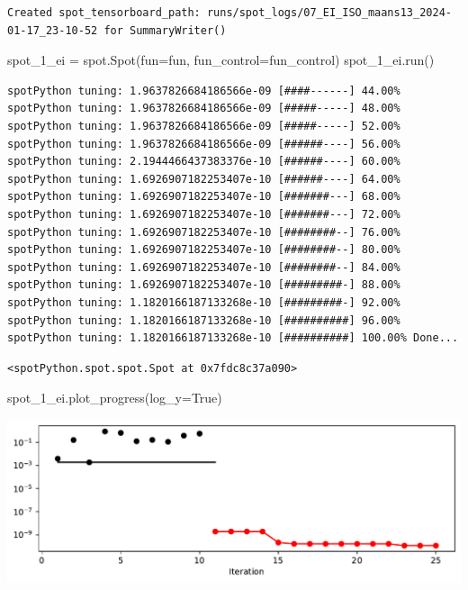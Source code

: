 \documentclass[
  letterpaper,
  DIV=11,
  numbers=noendperiod]{scrreprt}
\newenvironment{Shaded}{\begin{snugshade}}{\end{snugshade}}
\newcommand{\NormalTok}[1]{\textcolor[rgb]{0.00,0.23,0.31}{#1}}
\newcommand{\OperatorTok}[1]{\textcolor[rgb]{0.37,0.37,0.37}{#1}}
\newcommand{\VariableTok}[1]{\textcolor[rgb]{0.07,0.07,0.07}{#1}}
\begin{document}
\begin{verbatim}
Created spot_tensorboard_path: runs/spot_logs/07_EI_ISO_maans13_2024-01-17_23-10-52 for SummaryWriter()
\end{verbatim}

\begin{Shaded}
\begin{Highlighting}[]
\NormalTok{spot\_1\_ei }\OperatorTok{=}\NormalTok{ spot.Spot(fun}\OperatorTok{=}\NormalTok{fun,}
\NormalTok{                     fun\_control}\OperatorTok{=}\NormalTok{fun\_control)}
\NormalTok{spot\_1\_ei.run()}
\end{Highlighting}
\end{Shaded}

\begin{verbatim}
spotPython tuning: 1.9637826684186566e-09 [####------] 44.00% 
spotPython tuning: 1.9637826684186566e-09 [#####-----] 48.00% 
spotPython tuning: 1.9637826684186566e-09 [#####-----] 52.00% 
spotPython tuning: 1.9637826684186566e-09 [######----] 56.00% 
spotPython tuning: 2.1944466437383376e-10 [######----] 60.00% 
spotPython tuning: 1.6926907182253407e-10 [######----] 64.00% 
spotPython tuning: 1.6926907182253407e-10 [#######---] 68.00% 
spotPython tuning: 1.6926907182253407e-10 [#######---] 72.00% 
spotPython tuning: 1.6926907182253407e-10 [########--] 76.00% 
spotPython tuning: 1.6926907182253407e-10 [########--] 80.00% 
spotPython tuning: 1.6926907182253407e-10 [########--] 84.00% 
spotPython tuning: 1.6926907182253407e-10 [#########-] 88.00% 
spotPython tuning: 1.1820166187133268e-10 [#########-] 92.00% 
spotPython tuning: 1.1820166187133268e-10 [##########] 96.00% 
spotPython tuning: 1.1820166187133268e-10 [##########] 100.00% Done...
\end{verbatim}

\begin{verbatim}
<spotPython.spot.spot.Spot at 0x7fdc8c37a090>
\end{verbatim}

\begin{Shaded}
\begin{Highlighting}[]
\NormalTok{spot\_1\_ei.plot\_progress(log\_y}\OperatorTok{=}\VariableTok{True}\NormalTok{)}
\end{Highlighting}
\end{Shaded}

\includegraphics{012_num_spot_ei_files/figure-pdf/cell-10-output-1.pdf}
\end{document}
